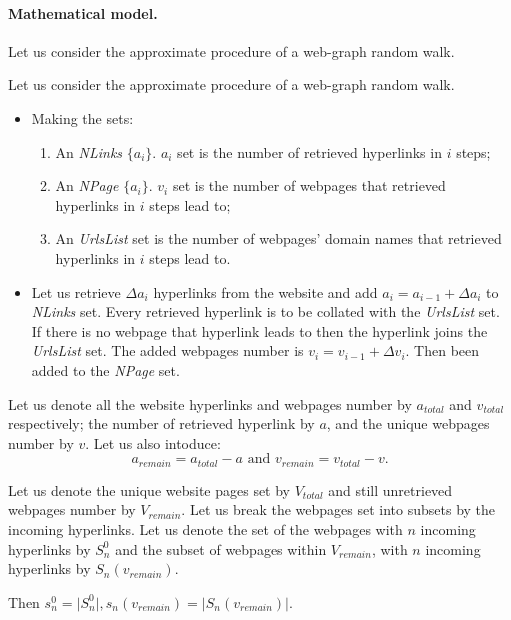 \paragraph{Mathematical model.} Let us consider the approximate procedure of a web-graph random walk.

Let us consider the approximate procedure of a web-graph random walk.

\begin{itemize}
	\item Making the sets:
	\begin{enumerate}
		\item An \textit{NLinks} \(\{ a_i \}\). \(a_i\) set is the number of retrieved hyperlinks in \(i\) steps;
		\item An \textit{NPage} \(\{ a_i \}\). \(v_i\) set is the number of webpages that retrieved hyperlinks in \(i\) steps lead to;
		\item An \textit{UrlsList} set is the number of webpages’ domain names that retrieved hyperlinks in \(i\) steps lead to.
	\end{enumerate}
	\item Let us retrieve \(\Delta a_i\) hyperlinks from the website and add \(a_i = a_{i-1} + \Delta a_i\) to \textit{NLinks} set. Every retrieved hyperlink is to be collated with the \textit{UrlsList} set. If there is no webpage that hyperlink leads to then the hyperlink joins the \textit{UrlsList} set. The added webpages number is \(v_i = v_{i-1} + \Delta v_i\). Then been added to the \textit{NPage} set.
\end{itemize}

Let us denote all the website hyperlinks and webpages number by \(a_{total}\) and \(v_{total}\) respectively; the number of retrieved hyperlink by \(a\), and the unique webpages number by \(v\). Let us also intoduce:
\[
a_{remain} = a_{total} - a \text{ and } v_{remain} = v_{total} - v.
\]

Let us denote the unique website pages set by \(V_{total}\) and still unretrieved webpages number by \(V_{remain}\). Let us break the webpages set into subsets by the incoming hyperlinks. Let us
denote the set of the webpages with \(n\) incoming hyperlinks by \(S^0_n\) and the subset of webpages within \(V_{remain}\), with \(n\) incoming hyperlinks by \(S_n (v_{remain})\).

Then \(s^0_n = \lvert S^0_n \rvert, s_n (v_{remain}) = \lvert S_n (v_{remain}) \rvert\).

